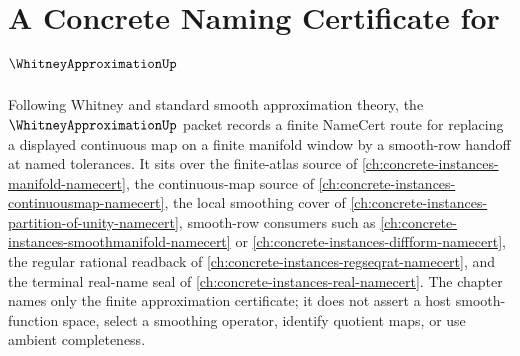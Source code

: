 \chapter{A Concrete Naming Certificate for $\WhitneyApproximationUp$}
\label{ch:concrete-instances-whitney-approximation-namecert}

Following Whitney and standard smooth approximation theory, the $\WhitneyApproximationUp$ packet records a finite NameCert route for replacing a displayed continuous map on a finite manifold window by a smooth-row handoff at named tolerances. It sits over the finite-atlas source of \autoref{ch:concrete-instances-manifold-namecert}, the continuous-map source of \autoref{ch:concrete-instances-continuousmap-namecert}, the local smoothing cover of \autoref{ch:concrete-instances-partition-of-unity-namecert}, smooth-row consumers such as \autoref{ch:concrete-instances-smoothmanifold-namecert} or \autoref{ch:concrete-instances-diffform-namecert}, the regular rational readback of \autoref{ch:concrete-instances-regseqrat-namecert}, and the terminal real-name seal of \autoref{ch:concrete-instances-real-namecert}. The chapter names only the finite approximation certificate; it does not assert a host smooth-function space, select a smoothing operator, identify quotient maps, or use ambient completeness.

